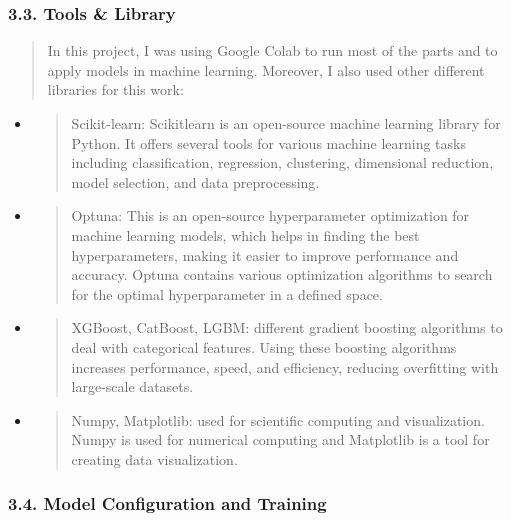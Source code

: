 \documentclass[
]{article}
\begin{document}
\hypertarget{tools-library}{%
\subsubsection{\texorpdfstring{\textbf{3.3. Tools \&
Library}}{3.3. Tools \& Library}}\label{tools-library}}

\begin{quote}
In this project, I was using Google Colab to run most of the parts and
to apply models in machine learning. Moreover, I also used other
different libraries for this work:
\end{quote}

\begin{itemize}
\item
  \begin{quote}
  Scikit-learn: Scikitlearn is an open-source machine learning library
  for Python. It offers several tools for various machine learning tasks
  including classification, regression, clustering, dimensional
  reduction, model selection, and data preprocessing.
  \end{quote}
\item
  \begin{quote}
  Optuna: This is an open-source hyperparameter optimization for machine
  learning models, which helps in finding the best hyperparameters,
  making it easier to improve performance and accuracy. Optuna contains
  various optimization algorithms to search for the optimal
  hyperparameter in a defined space.
  \end{quote}
\item
  \begin{quote}
  XGBoost, CatBoost, LGBM: different gradient boosting algorithms to
  deal with categorical features. Using these boosting algorithms
  increases performance, speed, and efficiency, reducing overfitting
  with large-scale datasets.
  \end{quote}
\item
  \begin{quote}
  Numpy, Matplotlib: used for scientific computing and visualization.
  Numpy is used for numerical computing and Matplotlib is a tool for
  creating data visualization.
  \end{quote}
\end{itemize}

\hypertarget{model-configuration-and-training}{%
\subsubsection{\texorpdfstring{\textbf{3.4. Model Configuration and
Training}}{3.4. Model Configuration and Training}}\label{model-configuration-and-training}}
\end{document}
